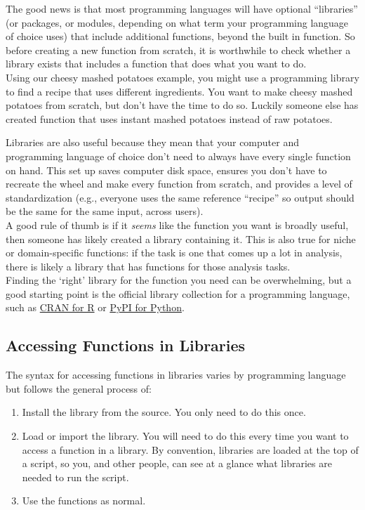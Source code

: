 \documentclass[
]{book}
\providecommand{\tightlist}{%
  \setlength{\itemsep}{0pt}\setlength{\parskip}{0pt}}
\begin{document}
The good news is that most programming languages will have optional ``libraries'' (or packages, or modules, depending on what term your programming language of choice uses) that include additional functions, beyond the built in function. So before creating a new function from scratch, it is worthwhile to check whether a library exists that includes a function that does what you want to do.\\

Using our cheesy mashed potatoes example, you might use a programming library to find a recipe that uses different ingredients. You want to make cheesy mashed potatoes from scratch, but don't have the time to do so. Luckily someone else has created function that uses instant mashed potatoes instead of raw potatoes.

Libraries are also useful because they mean that your computer and programming language of choice don't need to always have every single function on hand. This set up saves computer disk space, ensures you don't have to recreate the wheel and make every function from scratch, and provides a level of standardization (e.g., everyone uses the same reference ``recipe'' so output should be the same for the same input, across users).\\

A good rule of thumb is if it \emph{seems} like the function you want is broadly useful, then someone has likely created a library containing it. This is also true for niche or domain-specific functions: if the task is one that comes up a lot in analysis, there is likely a library that has functions for those analysis tasks.\\

Finding the `right' library for the function you need can be overwhelming, but a good starting point is the official library collection for a programming language, such as \href{https://cran.r-project.org/web/views/}{CRAN for R} or \href{https://pypi.org/}{PyPI for Python}.

\subsection{Accessing Functions in Libraries}\label{accessing-functions-in-libraries}

The syntax for accessing functions in libraries varies by programming language but follows the general process of:

\begin{enumerate}
\def\labelenumi{\arabic{enumi}.}
\tightlist
\item
  Install the library from the source. You only need to do this once.
\item
  Load or import the library. You will need to do this every time you want to access a function in a library. By convention, libraries are loaded at the top of a script, so you, and other people, can see at a glance what libraries are needed to run the script.
\item
  Use the functions as normal.
\end{enumerate}
\end{document}
